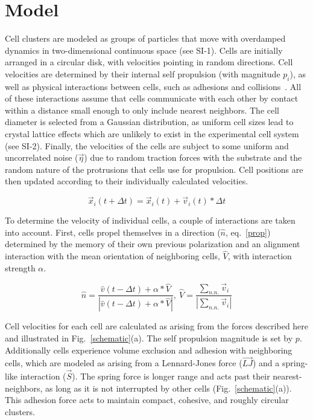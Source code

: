 \documentclass{article}
\begin{document}
\section*{Model}

Cell clusters are modeled as groups of particles that move with overdamped dynamics in two-dimensional continuous space (see SI-1). Cells are initially arranged in a circular disk, with velocities pointing in random directions. Cell velocities are determined by their internal self propulsion (with magnitude $p_i$), as well as physical interactions between cells, such as adhesions and collisions~\cite{Belmonte2008,Sepulveda2013}.  All of these interactions assume that cells communicate with each other by contact within a distance small enough to only include nearest neighbors. The cell diameter is selected from a Gaussian distribution, as uniform cell sizes lead to crystal lattice effects which are unlikely to exist in the experimental cell system (see SI-2). Finally, the velocities of the cells are subject to some uniform and uncorrelated noise ($\vec{\eta}$) due to random traction forces with the substrate and the random nature of the protrusions that cells use for propulsion. Cell positions are then updated according to their individually calculated velocities.

\begin{equation}
\vec{x}_i(t+\Delta t) = \vec{x}_i(t) + \vec{v}_i (t) *\Delta t
\label{pos}
\end{equation}

To determine the velocity of individual cells, a couple of interactions are taken into account. First, cells propel themselves in a direction ($\hat{n}$, eq.~\ref{prop}) determined by the memory of their own previous polarization and an alignment interaction with the mean orientation of neighboring cells, $\hat{V}$, with interaction strength $\alpha$.
 
\begin{equation}
\hat{n}=\frac{\hat{v}(t-\Delta t)+\alpha*\hat{V}}{|\hat{v}(t-\Delta t)+\alpha*\hat{V}|}, \: \hat{V}=\frac{\sum_{n.n.} \vec{v}_i}{|\sum_{n.n.} \vec{v}_i|}
\label{prop}
\end{equation}
 
Cell velocities for each cell are calculated as arising from the forces described here and illustrated in Fig.~\ref{schematic}(a). The self propulsion magnitude is set by $p$.  Additionally cells experience volume exclusion and adhesion with neighboring cells, which are modeled as arising from a Lennard-Jones force ($\vec{LJ}$) and a spring-like interaction ($\vec{S}$). The spring force is longer range and acts past their nearest-neighbors, as long as it is not interrupted by other cells (Fig.~\ref{schematic}(a)). This adhesion force acts to maintain compact, cohesive, and roughly circular clusters.
 
\end{document}
